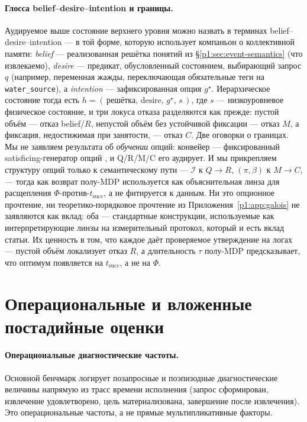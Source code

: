 \documentclass{article}
\newcommand{\method}[1]{\texttt{#1}}
\begin{document}
\paragraph{Глосса belief--desire--intention и границы.}
Аудируемое выше состояние верхнего уровня можно назвать в
терминах belief--desire--intention --- в той форме, которую использует
компаньон о коллективной памяти: \emph{belief} --- реализованная решётка
понятий из \S\ref{p1:sec:event-semantics} (что извлекаемо), \emph{desire} ---
предикат, обусловленный состоянием, выбирающий запрос $q$ (например,
переменная жажды, переключающая обязательные теги на \method{water\_source}),
а \emph{intention} --- зафиксированная опция $g^\star$. Иерархическое
состояние тогда есть $h=(\,\text{решётка},\,\text{desire},\,g^\star,\,s\,)$, где
$s$ --- низкоуровневое физическое состояние, и три локуса отказа разделяются как
прежде: пустой объём --- отказ belief/$R$, непустой объём
без устойчивой фиксации --- отказ $M$, а фиксация, недостижимая при
занятости, --- отказ $C$. Две оговорки о границах. Мы не заявляем результата
об \emph{обучении} опций: конвейер --- фиксированный satisficing-генератор опций
\citep{simon1955behavioral}, и Q/R/M/C его аудирует. И мы прикрепляем
структуру опций только к семантическому пути --- $\mathcal{I}$ к
$Q\!\rightarrow\!R$, $(\pi,\beta)$ к $M\!\rightarrow\!C$, --- тогда как
возврат полу-MDP используется как объяснительная линза для расщепления
$\Phi$-против-$t_{\mathrm{succ}}$, а не фитируется к данным. Ни
это опционное прочтение, ни теоретико-порядковое прочтение из
Приложения~\ref{p1:app:galois} не заявляются как вклад: оба --- стандартные
конструкции, используемые как интерпретирующие линзы на измерительный протокол,
который и есть вклад статьи. Их ценность в том, что каждое даёт
проверяемое утверждение на логах --- пустой объём локализует отказ $R$,
а длительность $\tau$ полу-MDP предсказывает, что оптимум
появляется на $t_{\mathrm{succ}}$, а не на $\Phi$.

\section{Операциональные и вложенные постадийные оценки}
\label{p1:app:estimators}

\paragraph{Операциональные диагностические частоты.}
Основной бенчмарк логирует позапросные и поэпизодные диагностические величины напрямую из трасс времени исполнения (запрос сформирован, извлечение удовлетворено, цель материализована, завершение после извлечения). Это операциональные частоты, а не прямые мультипликативные факторы.
\end{document}
